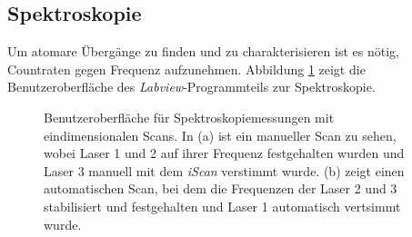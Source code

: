 \subsection{Spektroskopie}\label{subsec:spektroskopie_software}
Um atomare Übergänge zu finden und zu charakterisieren ist es nötig, Countraten
gegen Frequenz aufzunehmen. Abbildung \ref{fig:spektroskopie_benutzeroberflaeche}
zeigt die Benutzeroberfläche des \textit{Labview}-Programmteils zur
Spektroskopie.
\begin{figure}[h]
 	\centering
	\caption[Benutzeroberfläche
	Spektroskopie]{Benutzeroberfläche für Spektroskopiemessungen mit
	eindimensionalen Scans. In (a) ist ein manueller Scan zu sehen, wobei Laser 1
	und 2 auf ihrer Frequenz festgehalten wurden und Laser 3 manuell mit dem
	\textit{iScan} verstimmt wurde. (b) zeigt einen automatischen Scan, bei dem die
	Frequenzen der Laser 2 und 3 stabilisiert und festgehalten und Laser 1
	automatisch vertsimmt wurde.}
	\label{fig:spektroskopie_benutzeroberflaeche}
\end{figure}
